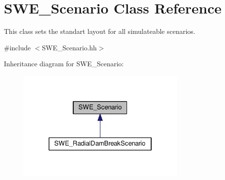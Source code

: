 \hypertarget{classSWE__Scenario}{}\section{S\+W\+E\+\_\+\+Scenario Class Reference}
\label{classSWE__Scenario}


This class sets the standart layout for all simulateable scenarios.  




{\ttfamily \#include $<$S\+W\+E\+\_\+\+Scenario.\+hh$>$}



Inheritance diagram for S\+W\+E\+\_\+\+Scenario\+:\nopagebreak
\begin{figure}[H]
\begin{center}
\leavevmode
\includegraphics[width=238pt]{classSWE__Scenario__inherit__graph}
\end{center}
\end{figure}
